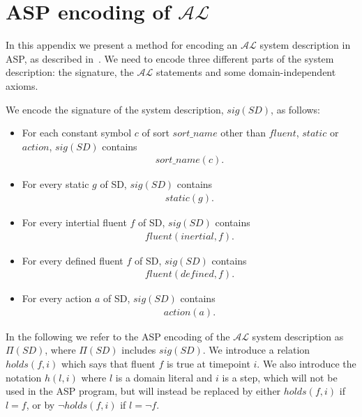 \documentclass[../interim.tex]{subfiles}
\begin{document}
\section{ASP encoding of $\mathcal{AL}$} \label{appendix-al}

In this appendix we present a method for encoding an $\mathcal{AL}$ system description in ASP, as described in~\cite{krr-asp-book}. We need to encode three different parts of the system description: the signature, the $\mathcal{AL}$ statements and some domain-independent axioms.

\noindent
We encode the signature of the system description, $sig(SD)$, as follows:
\begin{itemize}
  \item For each constant symbol $c$ of sort $sort\_name$ other than $fluent$, $static$ or $action$, $sig(SD)$ contains \begin{align} sort\_name(c). \end{align}

  \item For every static $g$ of SD, $sig(SD)$ contains \begin{align} static(g). \end{align}

  \item For every intertial fluent $f$ of SD, $sig(SD)$ contains \begin{align} fluent(inertial, f). \end{align}

  \item For every defined fluent $f$ of SD, $sig(SD)$ contains \begin{align} fluent(defined, f). \end{align}

  \item For every action $a$ of SD, $sig(SD)$ contains \begin{align} action(a). \end{align}
\end{itemize}

In the following we refer to the ASP encoding of the $\mathcal{AL}$ system description as $\Pi(SD)$, where $\Pi(SD)$ includes $sig(SD)$. We introduce a relation $holds(f, i)$ which says that fluent $f$ is true at timepoint $i$. We also introduce the notation $h(l, i)$ where $l$ is a domain literal and $i$ is a step, which will not be used in the ASP program, but will instead be replaced by either $holds(f, i)$ if $l = f$, or by $\neg holds(f, i)$ if $l = \neg f$.
\end{document}
